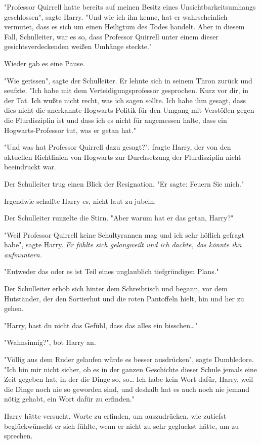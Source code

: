 {"Professor Quirrell hatte bereits auf meinen Besitz eines Unsichtbarkeitsumhangs geschlossen", sagte Harry. "Und wie ich ihn kenne, hat er wahrscheinlich vermutet, dass es sich um einen Heiligtum des Todes handelt. Aber in diesem Fall, Schulleiter, war es so, dass Professor Quirrell unter einem dieser gesichtsverdeckenden weißen Umhänge steckte."

Wieder gab es eine Pause.

"Wie gerissen", sagte der Schulleiter. Er lehnte sich in seinem Thron zurück und seufzte. "Ich habe mit dem Verteidigungsprofessor gesprochen. Kurz vor dir, in der Tat. Ich wußte nicht recht, was ich sagen sollte. Ich habe ihm gesagt, dass dies nicht die anerkannte Hogwarts-Politik für den Umgang mit Verstößen gegen die Flurdisziplin ist und dass ich es nicht für angemessen halte, dass ein Hogwarts-Professor tut, was er getan hat."

"Und was hat Professor Quirrell dazu gesagt?", fragte Harry, der von den aktuellen Richtlinien von Hogwarts zur Durchsetzung der Flurdisziplin nicht beeindruckt war.

Der Schulleiter trug einen Blick der Resignation. "Er sagte: Feuern Sie mich."

Irgendwie schaffte Harry es, nicht laut zu jubeln.

Der Schulleiter runzelte die Stirn. "Aber warum hat er das getan, Harry?"

"Weil Professor Quirrell keine Schultyrannen mag und ich sehr höflich gefragt habe", sagte Harry. \emph{Er fühlte sich gelangweilt und ich dachte, das könnte ihn aufmuntern.}

"Entweder das oder es ist Teil eines unglaublich tiefgründigen Plans."

Der Schulleiter erhob sich hinter dem Schreibtisch und begann, vor dem Hutständer, der den Sortierhut und die roten Pantoffeln hielt, hin und her zu gehen.

"Harry, hast du nicht das Gefühl, dass das alles ein bisschen…"

"Wahnsinnig?", bot Harry an.

"Völlig aus dem Ruder gelaufen würde es besser ausdrücken", sagte Dumbledore. "Ich bin mir nicht sicher, ob es in der ganzen Geschichte dieser Schule jemals eine Zeit gegeben hat, in der die Dinge so, so… Ich habe kein Wort dafür, Harry, weil die Dinge noch nie so geworden sind, und deshalb hat es auch noch nie jemand nötig gehabt, ein Wort dafür zu erfinden."

Harry hätte versucht, Worte zu erfinden, um auszudrücken, wie zutiefst beglückwünscht er sich fühlte, wenn er nicht zu sehr gegluckst hätte, um zu sprechen.

}
